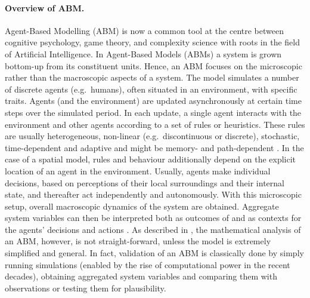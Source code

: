 \paragraph{Overview of ABM.}
Agent-Based Modelling (ABM) is now a common tool at the centre between cognitive psychology, game theory, and complexity science \citep{Bousquet2004} with roots in the field of Artificial Intelligence.
In Agent-Based Models (ABMs) a system is grown bottom-up from its constituent units.
Hence, an ABM focuses on the microscopic rather than the macroscopic aspects of a system.
The model simulates a number of discrete agents (e.g.\ humans), often situated in an environment, with specific traits.
Agents (and the environment) are updated asynchronously at certain time steps over the simulated period.
In each update, a single agent interacts with the environment and other agents according to a set of rules or heuristics.
These rules are usually heterogeneous, non-linear (e.g.\ discontinuous or discrete), stochastic, time-dependent and adaptive and might be memory- and path-dependent \citep{Bonabeau2002}.
In the case of a spatial model, rules and behaviour additionally depend on the explicit location of an agent in the environment.
Usually, agents make individual decisions, based on perceptions of their local surroundings and their internal state, and thereafter act independently and autonomously.
With this microscopic setup, overall macroscopic dynamics of the system are obtained.
Aggregate system variables can then be interpreted both as outcomes of and as contexts for the agents' decisions and actions \citep{Kohler2000}.
As described in \citet{Bousquet2004}, the mathematical analysis of an ABM, however, is not straight-forward, unless the model is extremely simplified and general.
In fact, validation of an ABM is classically done by simply running simulations (enabled by the rise of computational power in the recent decades), obtaining aggregated system variables and comparing them with observations or testing them for plausibility.






